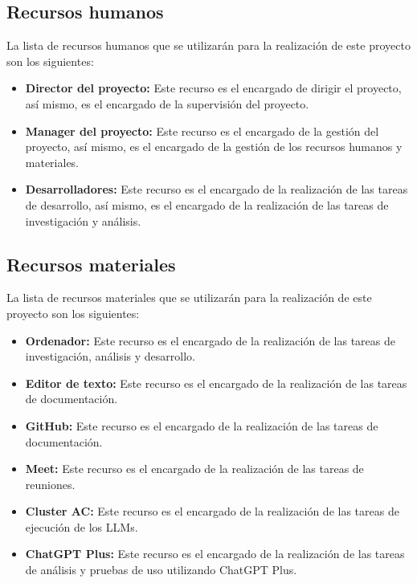 \subsection{Recursos humanos}
\label{subsec:recursos_humanos}


La lista de recursos humanos que se utilizarán para la realización de este proyecto son los siguientes:

\begin{itemize}
    \item \textbf{Director del proyecto:} Este recurso es el encargado de dirigir el proyecto, así mismo, es el encargado de la supervisión del proyecto.
    \item \textbf{Manager del proyecto:} Este recurso es el encargado de la gestión del proyecto, así mismo, es el encargado de la gestión de los recursos
        humanos y materiales.
    \item \textbf{Desarrolladores:} Este recurso es el encargado de la realización de las tareas de desarrollo, así mismo, es el encargado de la realización
        de las tareas de investigación y análisis.
\end{itemize}

\subsection{Recursos materiales}
\label{subsec:recursos_materiales}


La lista de recursos materiales que se utilizarán para la realización de este proyecto son los siguientes:

\begin{itemize}
    \item \textbf{Ordenador:} Este recurso es el encargado de la realización de las tareas de investigación, análisis y desarrollo.
    \item \textbf{Editor de texto:} Este recurso es el encargado de la realización de las tareas de documentación.
    \item \textbf{GitHub:} Este recurso es el encargado de la realización de las tareas de documentación.
    \item \textbf{Meet:} Este recurso es el encargado de la realización de las tareas de reuniones.
    \item \textbf{Cluster AC:} Este recurso es el encargado de la realización de las tareas de ejecución de los LLMs.
    \item \textbf{ChatGPT Plus:} Este recurso es el encargado de la realización de las tareas de análisis y pruebas de uso utilizando ChatGPT Plus.
\end{itemize}

